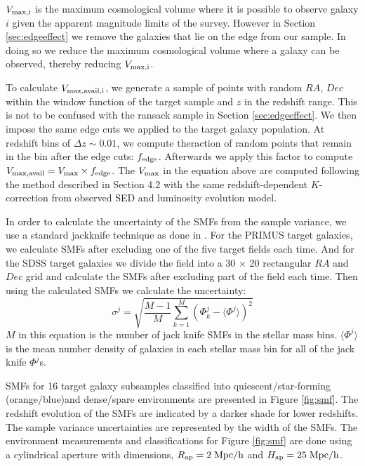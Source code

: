 \documentclass{emulateapj}
\begin{document}
$V_{\rm{max},i}$ is the maximum cosmological volume 
where it is possible to observe galaxy $i$ given the apparent 
magnitude limits of the survey. However in Section \ref{sec:edgeeffect} 
we remove the galaxies that lie on the edge from our sample. 
In doing so we reduce the maximum cosmological volume 
where a galaxy can be observed, thereby reducing $V_{\rm{max},i}$.

To calculate $V_{\rm{max,avail},i}$, we generate a sample of 
points with random $RA$, $Dec$ within the window function of 
the target sample and $z$ in the redshift range. This is not to be 
confused with the ransack sample in Section \ref{sec:edgeeffect}. 
We then impose the same edge cuts we applied to the target 
galaxy population. At redshift bins of $\Delta z \sim 0.01$, we 
compute theraction of random points that remain in the bin after 
the edge cuts: $f_{\rm{edge}}$. Afterwards we apply this factor to 
compute $V_{\rm{max,avail}} = V_{\rm{max}} \times f_{\rm{edge}}$. 
The $V_{\rm{max}}$ in the equation above are computed following 
the method described in \cite{Moustakas:2013aa} Section 4.2 with 
the same redshift-dependent $K$-correction from observed SED 
and luminosity evolution model.

In order to calculate the uncertainty of the SMFs from the sample 
variance, we use a standard jackknife technique as done in \cite{Moustakas:2013aa}.
For the PRIMUS target galaxies, we calculate SMFs after excluding 
one of the five target fields each time. And for the SDSS target galaxies
we divide the field into a 30 $\times$ 20 rectangular $RA$ and $Dec$ 
grid and calculate the SMFs after excluding part of the field each time. 
Then using the calculated SMFs we calculate the uncertainty: 
\begin{equation}
\sigma^j = \sqrt{\frac{M-1}{M} \sum\limits_{k=1}^{M} (\Phi^j_k - \langle \Phi^j \rangle)^2}
\end{equation} 
$M$ in this equation is the number of jack knife SMFs in the stellar mass
bins. $\langle \Phi^j \rangle$ is the mean number density of galaxies 
in each stellar mass bin for all of the jack knife $\Phi^j$s. 

SMFs for 16 target galaxy subsamples classified into quiescent/star-forming (orange/blue)and 
dense/spare environments are presented in Figure \ref{fig:smf}. The 
redshift evolution of the SMFs are indicated by a darker shade for lower
redshifts. The sample variance uncertainties are represented by the 
width of the SMFs. The environment measurements and classifications
for Figure \ref{fig:smf} are done using a cylindrical aperture with dimensions,
$R_{\rm{ap}} = 2 \; \rm{Mpc}/h$ and $H_{\rm{ap}} = 25 \; \rm{Mpc}/h$. 
\end{document}
